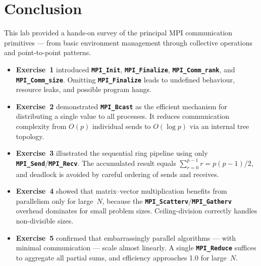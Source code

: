 \documentclass[12pt,a4paper]{article}
\newcommand{\mpiname}[1]{\texttt{\textbf{#1}}}
\begin{document}
\newpage
\section{Conclusion}

This lab provided a hands-on survey of the principal MPI communication
primitives — from basic environment management through collective
operations and point-to-point patterns.

\vspace{0.5em}
\begin{itemize}[leftmargin=1.8em, itemsep=0.5em]
  \item[\textcolor{primary}{\rule{4pt}{4pt}}]
    \textbf{Exercise~1} introduced \mpiname{MPI\_Init},
    \mpiname{MPI\_Finalize}, \mpiname{MPI\_Comm\_rank}, and
    \mpiname{MPI\_Comm\_size}.  Omitting \mpiname{MPI\_Finalize} leads to
    undefined behaviour, resource leaks, and possible program hangs.

  \item[\textcolor{primary}{\rule{4pt}{4pt}}]
    \textbf{Exercise~2} demonstrated \mpiname{MPI\_Bcast} as the efficient
    mechanism for distributing a single value to all processes.  It
    reduces communication complexity from $O(p)$ individual sends to
    $O(\log p)$ via an internal tree topology.

  \item[\textcolor{primary}{\rule{4pt}{4pt}}]
    \textbf{Exercise~3} illustrated the sequential ring pipeline using only
    \mpiname{MPI\_Send}/\mpiname{MPI\_Recv}.  The accumulated result equals
    $\sum_{r=0}^{p-1} r = p(p-1)/2$, and deadlock is avoided by careful
    ordering of sends and receives.

  \item[\textcolor{primary}{\rule{4pt}{4pt}}]
    \textbf{Exercise~4} showed that matrix–vector multiplication benefits
    from parallelism only for large~$N$, because the
    \mpiname{MPI\_Scatterv}/\mpiname{MPI\_Gatherv} overhead dominates
    for small problem sizes.  Ceiling-division correctly handles
    non-divisible sizes.

  \item[\textcolor{primary}{\rule{4pt}{4pt}}]
    \textbf{Exercise~5} confirmed that embarrassingly parallel algorithms
    — with minimal communication — scale almost linearly.
    A single \mpiname{MPI\_Reduce} suffices to aggregate all partial sums,
    and efficiency approaches 1.0 for large~$N$.
\end{itemize}
\end{document}
